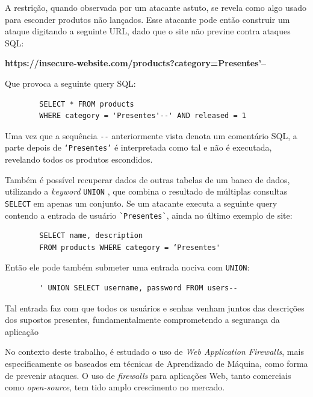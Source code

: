 \begin{alineas}
    A restrição, quando observada por um atacante astuto, se revela como algo usado para esconder produtos não lançados. Esse atacante pode então construir um ataque digitando a seguinte URL, dado que o site não previne contra ataques SQL:
        
    \textbf{https://insecure-website.com/products?category=Presentes’--}
    
    Que provoca a seguinte query SQL:
    
    \begin{verbatim}
        SELECT * FROM products 
        WHERE category = 'Presentes'--' AND released = 1 
    \end{verbatim}
    
     Uma vez que a sequência \verb+--+ anteriormente vista denota um comentário SQL, a parte depois de 
    \verb+‘Presentes’+ é interpretada como tal e não é executada, revelando todos os produtos escondidos.

    \item
    Também é possível recuperar dados de outras tabelas de um banco de dados, utilizando a \textit{keyword} \verb+UNION+ \cite{mysql_union}, que combina o resultado de múltiplas consultas \verb+SELECT+ em apenas um conjunto. Se um atacante executa a seguinte query contendo a entrada de usuário \verb+`Presentes`+, ainda no último exemplo de site:
    
    \begin{verbatim}
        SELECT name, description
        FROM products WHERE category = ‘Presentes'
    \end{verbatim}
    
    Então ele pode também submeter uma entrada nociva com \verb+UNION+:
    
    \begin{verbatim}
        ' UNION SELECT username, password FROM users--
    \end{verbatim}
        
    Tal entrada faz com que todos os usuários e senhas venham juntos das descrições dos supostos presentes, fundamentalmente comprometendo a segurança da aplicação

\end{alineas}


No contexto deste trabalho, é estudado o uso de \textit{Web Application Firewalls}, mais especificamente os baseados em técnicas de Aprendizado de Máquina, como forma de prevenir ataques. O uso de \textit{firewalls} para aplicações Web, tanto comerciais como \textit{open-source}, tem tido amplo  crescimento no mercado.

